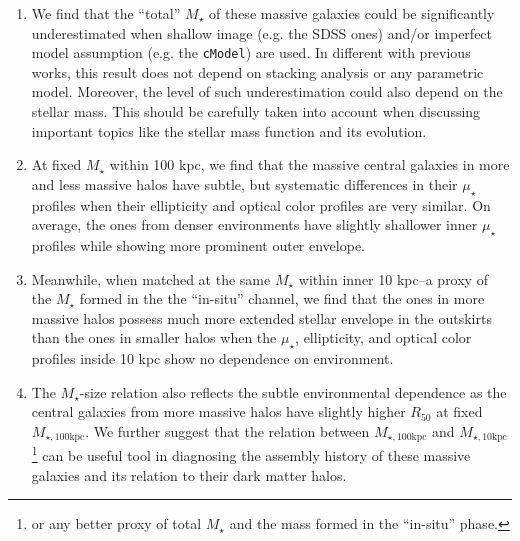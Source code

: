 \documentclass{emulateapj}
\def\mstar{{$M_{\star}$}}
\def\minn{{$M_{\star,10\mathrm{kpc}}$}}
\def\mtot{{$M_{\star,100\mathrm{kpc}}$}}
\def\mden{{$\mu_{\star}$}}
\newcommand{\update}[1]{\textcolor{Bittersweet}{#1}}
\begin{document}
\begin{CJK*}{UTF8}{gbsn}
    \begin{enumerate}
        \item \update{
            We find that the ``total'' \mstar{} of these massive galaxies could be 
            significantly underestimated when shallow image (e.g. the SDSS ones) 
            and/or imperfect model assumption (e.g. the \texttt{cModel}) are used.
            In different with previous works, this result does not depend on stacking 
            analysis or any parametric model. 
            Moreover, the level of such underestimation could also depend on the 
            stellar mass. 
            This should be carefully taken into account when discussing important 
            topics like the stellar mass function and its evolution.
            }
        \item \update{
            At fixed \mstar{} within 100 kpc, we find that the massive central 
            galaxies in more and less massive halos have subtle, but systematic 
            differences in their \mden{} profiles when their ellipticity and optical 
            color profiles are very similar. 
            On average, the ones from denser environments have slightly shallower 
            inner \mden{} profiles while showing more prominent outer envelope.
            }
        \item \update{
            Meanwhile, when matched at the same \mstar{} within inner 10 kpc--a 
            proxy of the \mstar{} formed in the the ``in-situ'' channel, we find 
            that the ones in more massive halos possess much more extended stellar 
            envelope in the outskirts than the ones in smaller halos when the 
            \mden{}, ellipticity, and optical color profiles inside 10 kpc show 
            no dependence on environment. 
            }
        \item \update{
            The \mstar{}-size relation also reflects the subtle environmental 
            dependence as the central galaxies from more massive halos have 
            slightly higher $R_{\mathrm{50}}$ at fixed \mtot{}. 
            We further suggest that the relation between \mtot{} and 
            \minn{}\footnote{or any better proxy of total \mstar{} and the mass 
            formed in the ``in-situ'' phase.} can be useful tool in diagnosing the
            assembly history of these massive galaxies and its relation to their 
            dark matter halos. 
            }
    \end{enumerate}


\end{CJK*}
\end{document}
